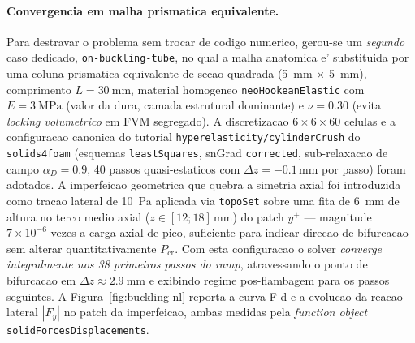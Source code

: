 \paragraph{Convergencia em malha prismatica equivalente.} Para destravar o problema sem trocar de codigo numerico, gerou-se um \emph{segundo} caso dedicado, \texttt{on-buckling-tube}, no qual a malha anatomica e' substituida por uma coluna prismatica equivalente de secao quadrada (\SI{5}{\milli\meter} $\times$ \SI{5}{\milli\meter}), comprimento $L = \SI{30}{\milli\meter}$, material homogeneo \texttt{neoHookeanElastic} com $E = \SI{3}{\mega\pascal}$ (valor da dura, camada estrutural dominante) e $\nu = 0.30$ (evita \emph{locking volumetrico} em FVM segregado). A discretizacao $6 \times 6 \times 60$ celulas e a configuracao canonica do tutorial \texttt{hyperelasticity/cylinderCrush} do \texttt{solids4foam} (esquemas \texttt{leastSquares}, snGrad \texttt{corrected}, sub-relaxacao de campo $\alpha_D = 0.9$, 40 passos quasi-estaticos com $\Delta z = -0.1\,\si{\milli\meter}$ por passo) foram adotados. A imperfeicao geometrica que quebra a simetria axial foi introduzida como tracao lateral de \SI{10}{\pascal} aplicada via \texttt{topoSet} sobre uma fita de \SI{6}{\milli\meter} de altura no terco medio axial ($z \in [12;18]\,\si{\milli\meter}$) do patch $y^+$ --- magnitude $7 \times 10^{-6}$ vezes a carga axial de pico, suficiente para indicar direcao de bifurcacao sem alterar quantitativamente $P_{\mathrm{cr}}$. Com esta configuracao o solver \emph{converge integralmente nos 38 primeiros passos do ramp}, atravessando o ponto de bifurcacao em $\Delta z \approx \SI{2.9}{\milli\meter}$ e exibindo regime pos-flambagem para os passos seguintes. A Figura~\ref{fig:buckling-nl} reporta a curva F-d e a evolucao da reacao lateral $|F_y|$ no patch da imperfeicao, ambas medidas pela \emph{function object} \texttt{solidForcesDisplacements}.

